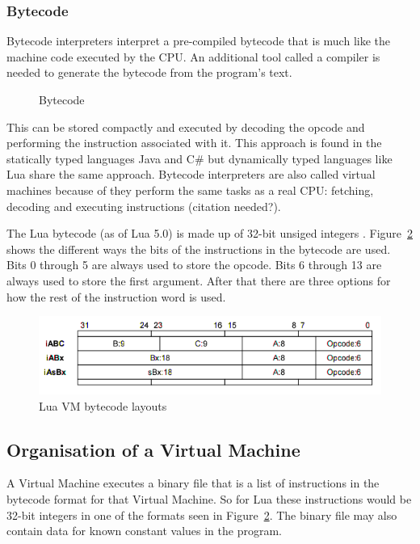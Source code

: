 \documentclass[english,a4paper]{article}
\begin{document}
\subsubsection{Bytecode}
Bytecode interpreters interpret a pre-compiled bytecode that is much
like the machine code executed by the CPU. An additional tool called a
compiler is needed to generate the bytecode from the program's text.

\begin{figure}
  \centering
  
  \caption{Bytecode}
  \label{fig:byte}
\end{figure}

This can be stored compactly and executed by decoding the opcode and
performing the instruction associated with it. This approach is found
in the statically typed languages Java and C\# but dynamically typed
languages like Lua share the same approach. Bytecode interpreters are
also called virtual machines because of they perform the same tasks as
a real CPU: fetching, decoding and executing instructions (citation
needed?).

The Lua bytecode (as of Lua 5.0) is made up of 32-bit unsiged integers
\cite{RobertoIerusalimschy}. Figure~\ref{fig:luabyte} shows the
different ways the bits of the instructions in the bytecode are
used. Bits 0 through 5 are always used to store the opcode. Bits 6
through 13 are always used to store the first argument. After that
there are three options for how the rest of the instruction word is
used.

\begin{figure}
  \includegraphics[width=\linewidth]{luabytecode.png}
  \caption{Lua VM bytecode layouts
    \protect\cite{RobertoIerusalimschy}}
  \label{fig:luabyte}
\end{figure}

\subsection{Organisation of a Virtual Machine} 
A Virtual Machine executes a binary file that is a list of
instructions in the bytecode format for that Virtual Machine. So for
Lua these instructions would be 32-bit integers in one of the formats
seen in Figure~\ref{fig:luabyte}. The binary file may also contain
data for known constant values in the program.
\end{document}
